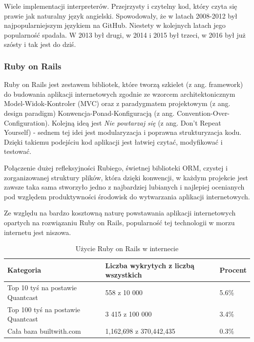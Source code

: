 Wiele implementacji interpreterów. Przejrzysty i czytelny kod, który czyta się prawie jak naturalny język angielski. Spowodowały, że w latach 2008-2012 był najpopularniejszym językiem na GitHub.\cite{RubyStats2015} Niestety w kolejnych latach jego popularność spadała. W 2013 był drugi, w 2014 i 2015 był trzeci\cite{RubyStats2015}, w 2016 był już szósty i tak jest do dziś.\cite{GithutStats2017}

\subsubsection{Ruby on Rails}
Ruby on Rails jest zestawem bibliotek, które tworzą szkielet (z ang. framework) do budowania aplikacji  internetowych zgodnie ze wzorcem architektonicznym Model-Widok-Kontroler (MVC) oraz z paradygmatem projektowym (z ang. design paradigm) Konwencja-Ponad-Konfiguracją (z ang. Convention-Over-Configuration). Kolejną ideą jest \textit{Nie powtarzaj się} (z ang. Don't Repeat Yourself) - sednem tej idei jest modularyzacja i poprawna strukturyzacja kodu. Dzięki takiemu podejściu kod aplikacji jest łatwiej czytać, modyfikować i testować. 


Połączenie dużej refleksyjności Rubiego, świetnej biblioteki ORM, czystej i zorganizowanej struktury plików, która dzięki konwencji, w każdym projekcie jest zawsze taka sama stworzyło jedno z najbardziej lubianych i najlepiej ocenianych pod względem produktywności środowisk do wytwarzania aplikacji internetowych.

Ze względu na bardzo kosztowną naturę powstawania aplikacji internetowych opartych na rozwiązaniu Ruby on Rails, popularność tej technologii w morzu internetu jest niszowa.\cite{TrendsBuiltWithRails}

\begin{table}
\caption{Użycie Ruby on Rails w internecie}
\label{table:rubyusage}
\begin{tabular}{ |l|l|l|  }
\hline
Kategoria & Liczba wykrytych z liczbą wszystkich & Procent \\
\hline
\hline
Top 10 tyś na postawie Quantcast & 558 z 10 000 & 5.6\% \\
\hline
Top 100 tyś na postawie Quantcast & 3 415 z 100 000 & 3.4\% \\
\hline
Cała baza builtwith.com & 1,162,698 z 370,442,435 & 0.3\% \\
\hline
\end{tabular}
\end{table}

